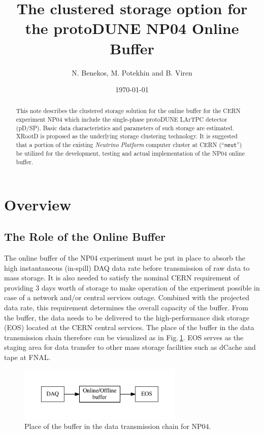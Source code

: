 \documentclass[pdftex,12pt,letter]{article}
\title{The clustered storage option for the protoDUNE NP04 Online Buffer}
\date{\today}
\author{N. Benekos, M. Potekhin and B. Viren}
\newcommand{\pdsp}{pD/SP\xspace}
\newcommand{\xrd}{XRootD\xspace}
\begin{document}
\maketitle

\begin{abstract}
\noindent  This note describes the clustered storage
solution for the online buffer for the CERN experiment NP04 which include the single-phase protoDUNE LArTPC detector (\pdsp).
Basic data characteristics and  parameters of such storage are estimated. \xrd is proposed as the underlying
storage clustering technology. It is suggested that a portion of the existing   \textit{Neutrino Platform}
computer cluster at CERN (``\texttt{neut}'') be utilized for the development, testing and actual implementation of the NP04 online buffer. 
\end{abstract}

\section{Overview}
\subsection{The Role of the Online Buffer}
\label{sec:the_role}
The online buffer of the NP04 experiment must be put in place to absorb the high instantaneous (in-spill) DAQ
data rate before transmission of raw data to mass storage. It is also needed to satisfy the nominal CERN requirement of
providing 3 days worth of storage to make operation of the experiment possible in case of a network and/or central services
outage. Combined with the projected data rate, this requirement determines the overall capacity of the buffer. From the buffer,
the data needs to be delivered to the high-performance  disk storage (EOS) located at the CERN central services.
The place of the buffer in the data transmission chain therefore can be visualized as in Fig.\,\ref{fig:big-picture}.
EOS serves as the staging area for data transfer to other mass storage facilities such as dCache and tape at FNAL.
\begin{figure}[tbh]
  \centering
  \includegraphics[width=0.7\textwidth]{figures/big-picture.pdf}
  \caption{Place of the buffer in the data transmission chain for NP04.}
  \label{fig:big-picture}
\end{figure}
\end{document}
